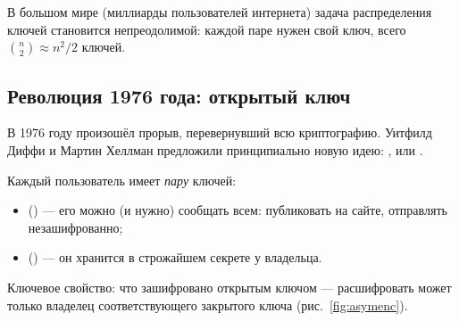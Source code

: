 В большом мире (миллиарды пользователей интернета) задача распределения ключей становится непреодолимой: каждой паре нужен свой ключ, всего $\binom{n}{2} \approx n^2/2$ ключей.

\subsection{Революция 1976 года: открытый ключ}

В 1976 году произошёл прорыв, перевернувший всю криптографию. Уитфилд Диффи и Мартин Хеллман предложили принципиально новую идею: , или .

Каждый пользователь имеет \emph{пару} ключей:
\begin{itemize}
  \item {} () --- его можно (и нужно) сообщать всем: публиковать на сайте, отправлять незашифрованно;
  \item {} () --- он хранится в строжайшем секрете у владельца.
\end{itemize}

Ключевое свойство: что зашифровано открытым ключом --- расшифровать может только владелец соответствующего закрытого ключа (рис.~\ref{fig:asymenc}).

